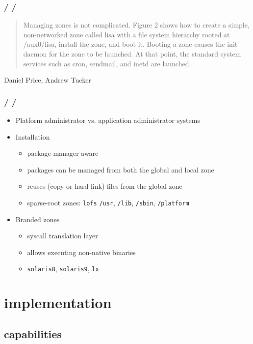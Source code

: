 \documentclass{beamer}
\newcommand{\autotitle}
{\frametitle{
    \secname
    \ifx\insertsubsection\empty
    \else
        /\subsecname
        \ifx\insertsubsubsection\empty\else/\subsubsecname\fi
    \fi}}
\begin{document}
\begin{frame}
    \autotitle
    \begin{quote}
        Managing zones is not complicated.  Figure 2 shows how to create a
        simple, non-networked zone called lisa with a file system hierarchy
        rooted at /aux0/lisa, install the zone, and boot it.  Booting a zone
        causes the init daemon for the zone to be launched.  At that point, the
        standard system services such as cron, sendmail, and inetd are
        launched.
    \end{quote}
    Daniel Price, Andrew Tucker \cite{solaris_zones}
\end{frame}

\begin{frame}
    \autotitle
    \begin{itemize}
        \item Platform administrator vs. application administrator systems
        \item Installation
        \begin{itemize}
            \item package-manager aware
            \item packages can be managed from both the global and local zone
            \item reuses (copy or hard-link) files from the global zone
            \item
                sparse-root zones: \texttt{lofs} \texttt{/usr}, \texttt{/lib},
                \texttt{/sbin}, \texttt{/platform}
        \end{itemize}
        \item Branded zones
        \begin{itemize}
            \item syscall translation layer
            \item allows executing non-native binaries
            \item \texttt{solaris8}, \texttt{solaris9}, \texttt{lx}
        \end{itemize}
    \end{itemize}
\end{frame}

\section{implementation}

\subsection{capabilities}
\end{document}
